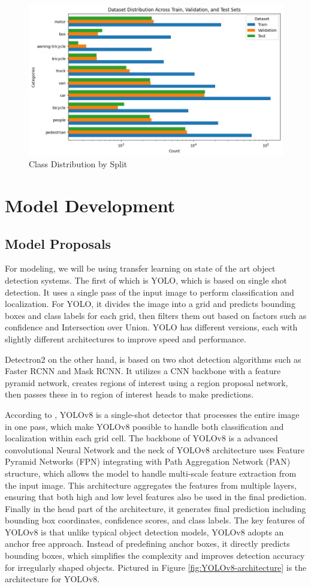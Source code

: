 \documentclass[stu,12pt,floatsintext]{apa7}
\begin{document}
\begin{figure}[!htb]
    \centering
    \includegraphics[width=0.75\linewidth]{class_distribution.png}
    \caption{Class Distribution by Split}
    \label{fig:cls_distrib}
\end{figure}

\section{Model Development}
\subsection{Model Proposals}
For modeling, we will be using transfer learning on state of the art object detection systems. The first of which is YOLO, which is based on single shot detection. It uses a single pass of the input image to perform classification and localization. For YOLO, it divides the image into a grid and predicts bounding boxes and class labels for each grid, then filters them out based on factors such as confidence and Intersection over Union. YOLO has different versions, each with slightly different architectures to improve speed and performance.

Detectron2 on the other hand, is based on two shot detection algorithms such as Faster RCNN and Mask RCNN. It utilizes a CNN backbone with a feature pyramid network, creates regions of interest using a region proposal network, then passes these in to region of interest heads to make predictions.

According to \textcite{yaseen2024YOLOv8},  YOLOv8 is a single-shot detector that processes the entire image in one pass, which make YOLOv8 possible to handle both classification and localization within each grid cell. The backbone of YOLOv8 is a advanced convolutional Neural Network and the neck of YOLOv8 architecture uses Feature Pyramid Networks (FPN) integrating with Path Aggregation Network (PAN) structure, which allows the model to handle multi-scale feature extraction from the input image. This architecture aggregates the features from multiple layers, ensuring that both high and low level features also be used in the final prediction. Finally in the head part of the architecture, it generates final prediction including bounding box coordinates, confidence scores, and class labels. The key features of YOLOv8 is that unlike typical object detection models, YOLOv8 adopts an anchor free approach. Instead of predefining anchor boxes, it directly predicts bounding boxes, which simplifies the complexity and improves detection accuracy for irregularly shaped objects. Pictured in Figure \ref{fig:YOLOv8-architecture} is the architecture for YOLOv8.
\end{document}
